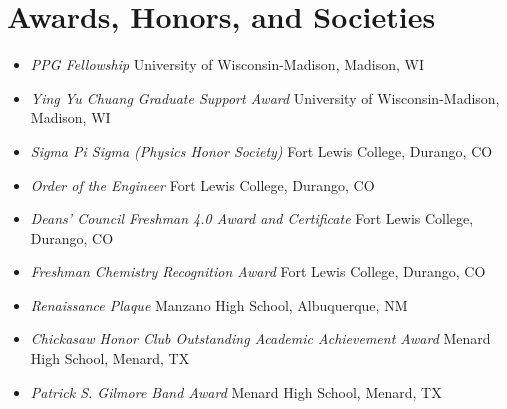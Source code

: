 \section{Awards, Honors, and Societies}

\begin{itemize}
    \item \textit{PPG Fellowship} \hfill University of Wisconsin-Madison, Madison, WI
    \item \textit{Ying Yu Chuang Graduate Support Award} \hfill University of Wisconsin-Madison, Madison, WI
    \item \textit{Sigma Pi Sigma (Physics Honor Society)} \hfill Fort Lewis College, Durango, CO
    \item \textit{Order of the Engineer} \hfill Fort Lewis College, Durango, CO
    \item \textit{Deans' Council Freshman 4.0 Award and Certificate} \hfill Fort Lewis College, Durango, CO
    \item \textit{Freshman Chemistry Recognition Award} \hfill Fort Lewis College, Durango, CO
    \item \textit{Renaissance Plaque} \hfill Manzano High School, Albuquerque, NM
    \item \textit{Chickasaw Honor Club Outstanding Academic Achievement Award} \hfill Menard High School, Menard, TX
    \item \textit{Patrick S. Gilmore Band Award} \hfill Menard High School, Menard, TX
\end{itemize}
